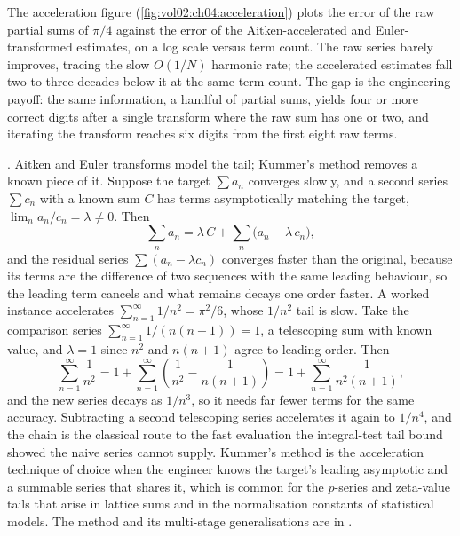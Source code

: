 

The acceleration figure (\autoref{fig:vol02:ch04:acceleration}) plots
the error of the raw partial sums of $\pi/4$ against the error of the
Aitken-accelerated and Euler-transformed estimates, on a log scale
versus term count. The raw series barely improves, tracing the slow
$O(1/N)$ harmonic rate; the accelerated estimates fall two to three
decades below it at the same term count. The gap is the engineering
payoff: the same information, a handful of partial sums, yields four or
more correct digits after a single transform where the raw sum has one
or two, and iterating the transform reaches six digits from the first
eight raw terms.

\begin{mastery}
. Aitken
and Euler transforms model the tail; Kummer's method removes a known
piece of it. Suppose the target $\sum a_{n}$ converges slowly, and a
second series $\sum c_{n}$ with a known sum $C$ has terms asymptotically
matching the target, $\lim_{n} a_{n}/c_{n} = \lambda \neq 0$. Then
\[
\sum_{n} a_{n} = \lambda\,C + \sum_{n}\bigl(a_{n} - \lambda\,c_{n}
\bigr),
\]
and the residual series $\sum (a_{n} - \lambda c_{n})$ converges faster
than the original, because its terms are the difference of two sequences
with the same leading behaviour, so the leading term cancels and what
remains decays one order faster. A worked instance accelerates
$\sum_{n=1}^{\infty} 1/n^{2} = \pi^{2}/6$, whose $1/n^{2}$ tail is slow.
Take the comparison series $\sum_{n=1}^{\infty} 1/(n(n+1)) = 1$, a
telescoping sum with known value, and $\lambda = 1$ since $n^{2}$ and
$n(n+1)$ agree to leading order. Then
\[
\sum_{n=1}^{\infty}\frac{1}{n^{2}} = 1 + \sum_{n=1}^{\infty}\left(
\frac{1}{n^{2}} - \frac{1}{n(n+1)}\right) = 1 + \sum_{n=1}^{\infty}
\frac{1}{n^{2}(n+1)},
\]
and the new series decays as $1/n^{3}$, so it needs far fewer terms for
the same accuracy. Subtracting a second telescoping series accelerates it
again to $1/n^{4}$, and the chain is the classical route to the fast
evaluation the integral-test tail bound showed the naive series cannot
supply. Kummer's method is the acceleration technique of choice when the
engineer knows the target's leading asymptotic and a summable series that
shares it, which is common for the $p$-series and zeta-value tails that
arise in lattice sums and in the normalisation constants of statistical
models. The method and its multi-stage generalisations are in
\cite{text:v2ch04-bender-orszag-1999}.
\end{mastery}

